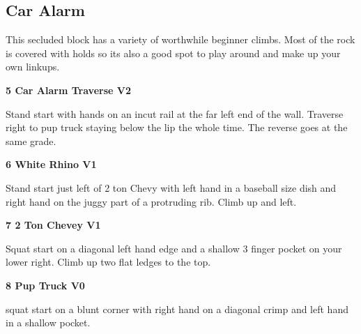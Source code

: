 \begin{multicols}{2}
			\subsection*{Car Alarm}\label{bf:Car Alarm}
			\begin{minipage}{\columnwidth}
			This secluded block has a variety of worthwhile beginner climbs. Most of the rock is covered with holds so its also a good spot to play around and make up your own linkups.
			\end{minipage}
			

					\begin{minipage}{\linewidth}	
					\label{rt:Car Alarm Traverse}\colorbox{green!20}{\textbf{5 Car Alarm Traverse V2 \ding{72}   }}
					\begin{adjustwidth}{0.5cm}{}				
					Stand start with hands on an incut rail at the far left end of the wall. Traverse right to pup truck staying below the lip the whole time. The reverse goes at the same grade.
					\end{adjustwidth}
					\end{minipage}
					\begin{minipage}{\linewidth}	
					\label{rt:White Rhino}\colorbox{green!20}{\textbf{6 White Rhino V1   }}
					\begin{adjustwidth}{0.5cm}{}				
					Stand start just left of 2 ton Chevy with left hand in a baseball size dish and right hand on the juggy part of a protruding rib. Climb up and left.
					\end{adjustwidth}
					\end{minipage}
					\begin{minipage}{\linewidth}	
					\label{rt:2 Ton Chevey}\colorbox{green!20}{\textbf{7 2 Ton Chevey V1    }}
					\begin{adjustwidth}{0.5cm}{}				
					Squat start on a diagonal left hand edge and a shallow 3 finger pocket on your lower right. Climb up two flat ledges to the top.
					\end{adjustwidth}
					\end{minipage}
					\begin{minipage}{\linewidth}	
					\label{rt:Pup Truck}\colorbox{green!20}{\textbf{8 Pup Truck V0    }}
					\begin{adjustwidth}{0.5cm}{}				
					squat start on a blunt corner with right hand on a diagonal crimp and left hand in a shallow pocket.
					\end{adjustwidth}
					\end{minipage}


\end{multicols}
